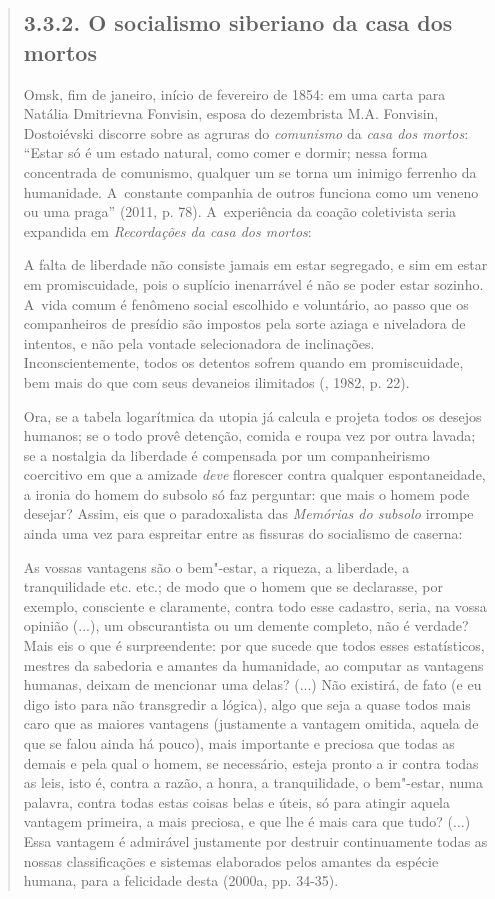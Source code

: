 {\begin{quote}
\subsection{3.3.2. O socialismo siberiano da casa dos mortos}

Omsk, fim de janeiro, início de fevereiro de 1854: em uma carta para
Natália Dmitrievna Fonvisin, esposa do dezembrista M.A. Fonvisin,
Dostoiévski discorre sobre as agruras do \emph{comunismo} da \emph{casa
dos mortos}: ``Estar só é um estado natural, como comer e dormir; nessa
forma concentrada de comunismo, qualquer um se torna um inimigo ferrenho
da humanidade. A~constante companhia de outros funciona como um veneno
ou uma praga'' (2011, p. 78). A~experiência da coação coletivista seria
expandida em \emph{Recordações da casa dos mortos}:

A falta de liberdade não consiste jamais em estar segregado, e sim em
estar em promiscuidade, pois o suplício inenarrável é não se poder estar
sozinho. A~vida comum é fenômeno social escolhido e voluntário, ao passo
que os companheiros de presídio são impostos pela sorte aziaga e
niveladora de intentos, e não pela vontade selecionadora de inclinações.
Inconscientemente, todos os detentos sofrem quando em promiscuidade, bem
mais do que com seus devaneios ilimitados (, 1982, p. 22).

Ora, se a tabela logarítmica da utopia já calcula e projeta todos os
desejos humanos; se o todo provê detenção, comida e roupa vez por outra
lavada; se a nostalgia da liberdade é compensada por um companheirismo
coercitivo em que a amizade \emph{deve} florescer contra qualquer
espontaneidade, a ironia do homem do subsolo só faz perguntar: que mais
o homem pode desejar? Assim, eis que o paradoxalista das \emph{Memórias
do subsolo} irrompe ainda uma vez para espreitar entre as fissuras do
socialismo de caserna:

As vossas vantagens são o bem"-estar, a riqueza, a liberdade, a
tranquilidade etc. etc.; de modo que o homem que se declarasse, por
exemplo, consciente e claramente, contra todo esse cadastro, seria, na
vossa opinião (...), um obscurantista ou um demente completo, não é
verdade? Mais eis o que é surpreendente: por que sucede que todos esses
estatísticos, mestres da sabedoria e amantes da humanidade, ao computar
as vantagens humanas, deixam de mencionar uma delas? (...) Não existirá,
de fato (e eu digo isto para não transgredir a lógica), algo que seja a
quase todos mais caro que as maiores vantagens (justamente a vantagem
omitida, aquela de que se falou ainda há pouco), mais importante e
preciosa que todas as demais e pela qual o homem, se necessário, esteja
pronto a ir contra todas as leis, isto é, contra a razão, a honra, a
tranquilidade, o bem"-estar, numa palavra, contra todas estas coisas
belas e úteis, só para atingir aquela vantagem primeira, a mais
preciosa, e que lhe é mais cara que tudo? (...) Essa vantagem é
admirável justamente por destruir continuamente todas as nossas
classificações e sistemas elaborados pelos amantes da espécie humana,
para a felicidade desta (2000a, pp. 34-35).


\end{quote}}
